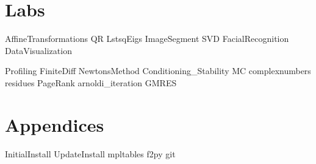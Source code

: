 \documentclass[nociteref]{SIAM-GH-book}
\begin{document}
\part{Labs} %
{AffineTransformations}
{QR}
{LstsqEigs}
{ImageSegment}
{SVD}
{FacialRecognition}
{DataVisualization}

{Profiling}
{FiniteDiff}
{NewtonsMethod}
{Conditioning_Stability}
{MC}
{complexnumbers}
{residues}
{PageRank}
{arnoldi_iteration}
{GMRES}


\part{Appendices} %
\begin{appendices}
{InitialInstall}
{UpdateInstall}
{mpltables}
{f2py}
{git}
\end{appendices}
\end{document}
